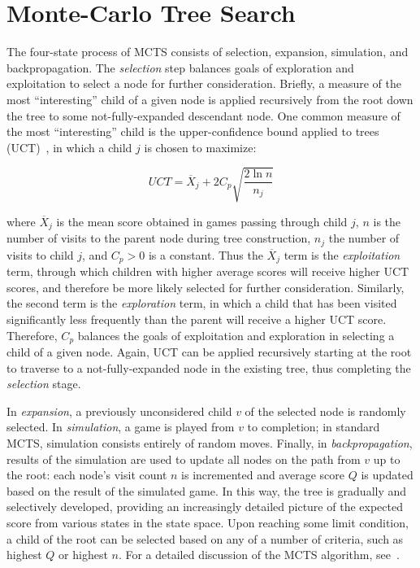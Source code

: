\documentclass[letterpaper]{article}
\begin{document}
\section{Monte-Carlo Tree Search}

The four-state process of MCTS consists of selection, expansion, simulation, and backpropagation. The {\it selection} step balances goals of exploration and exploitation to select a node for further consideration. Briefly, a measure of the most ``interesting'' child of a given node is applied recursively from the root down the tree to some not-fully-expanded descendant node. One common measure of the most ``interesting'' child is the upper-confidence bound applied to trees (UCT)~\cite{kocsis2006improved}, in which a child $j$ is chosen to maximize:

\begin{equation} \label{eq:UCT}
UCT = \overline{X}_j + 2C_p\sqrt{\frac{2\ln{n}}{n_j}}
\end{equation}

\noindent where $\overline{X}_j$ is the mean score obtained in games passing through child $j$, $n$ is the number of visits to the parent node during tree construction, $n_j$ the number of visits to child $j$, and $C_p > 0$ is a constant. Thus the $\overline{X}_j$ term is the {\it exploitation} term, through which children with higher average scores will receive higher UCT scores, and therefore be more likely selected for further consideration. Similarly, the second term is the {\it exploration} term, in which a child that has been visited significantly less frequently than the parent will receive a higher UCT score. Therefore, $C_p$ balances the goals of exploitation and exploration in selecting a child of a given node. Again, UCT can be applied recursively starting at the root to traverse to a not-fully-expanded node in the existing tree, thus completing the {\it selection} stage.

In {\it expansion}, a previously unconsidered child $v$ of the selected node is randomly selected. In {\it simulation}, a game is played from $v$ to completion; in standard MCTS, simulation consists entirely of random moves. Finally, in {\it backpropagation}, results of the simulation are used to update all nodes on the path from $v$ up to the root: each node's visit count $n$ is incremented and average score $Q$ is updated based on the result of the simulated game. In this way, the tree is gradually and selectively developed, providing an increasingly detailed picture of the expected score from various states in the state space. Upon reaching some limit condition, a child of the root can be selected based on any of a number of criteria, such as highest $Q$ or highest $n$. For a detailed discussion of the MCTS algorithm, see~\cite{browne2012survey}.
\end{document}
